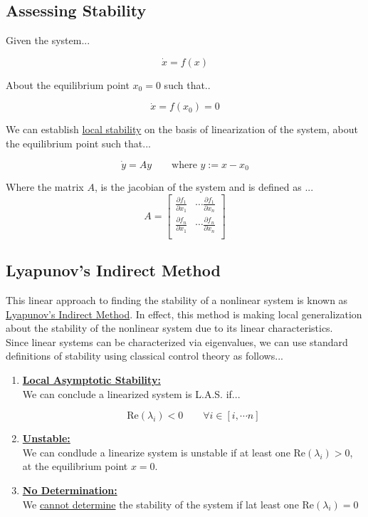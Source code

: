 \subsection*{Assessing Stability}

Given the system...

$$
\dot{x} = f(x)
$$

\noindent About the equilibrium point $x_0 = 0$ such that..

$$
\dot{x} = f(x_0) = 0
$$

\noindent We can establish \underline{local stability} on the basis of linearization of the system, about the equilibrium point such that...

$$
 \dot{y} = A y \quad \quad \text{where } y:= x -x_0
$$

\noindent Where the matrix $A$, is the jacobian of the system and is defined as ...
$$
 A =
  \begin{bmatrix}
    \frac{\partial f_1}{\partial x_1} & \cdots \frac{\partial f_1}{\partial x_n} \\
    \frac{\partial f_n}{\partial x_1} & \cdots \frac{\partial f_n}{\partial x_n} \\
   \end{bmatrix}
$$

\subsection*{Lyapunov's Indirect Method}
This linear approach to finding the stability of a nonlinear system is known as \underline{Lyapunov's Indirect Method}. In effect, this method is making local generalization about the stability of the nonlinear system due to its linear characteristics. \\

\noindent Since linear systems can be characterized via eigenvalues, we can use standard definitions of stability using classical control theory as follows...

\begin{enumerate}
  \item \textbf{\underline{Local Asymptotic Stability: }} \\

  We can conclude a linearized system is L.A.S. if...

  $$
  \text{Re}(\lambda_i) < 0 \quad \quad \forall i \in \left[ i, \cdots n  \right]
  $$

  \item \textbf{\underline{Unstable: }} \\

  We can condlude a linearize system is unstable if at least one $\text{Re}(\lambda_i) > 0$, at the equilibrium point $x = 0$.

  \item \textbf{\underline{No Determination: }} \\

  We \underline{cannot determine} the stability of the system if lat least one $\text{Re}(\lambda_i) = 0 $
\end{enumerate}



